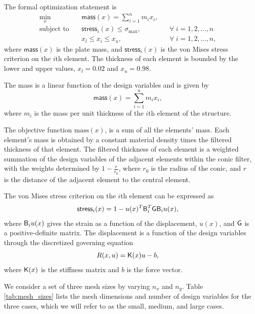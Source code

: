 The formal optimization statement is
\begin{equation*}
  \begin{alignedat}{2}
    \underset{x}{\text{min}} \quad &\textsf{mass}(x) = \sum_{i=1}^{n} m_i x_i, & &\\
    \text{subject to} \quad &\textsf{stress}_i(x) \leq \sigma_{\max}, &
    &\forall\; i = 1,2,\ldots,n \\
      & x_l \leq x_i \leq  x_u, \qquad & &\forall\; i = 1,2,\ldots,n,
  \end{alignedat}
\end{equation*}
where $\textsf{mass}(x)$ is the plate mass, and $\textsf{stress}_{i}(x)$ is the
von Mises stress criterion on the $i$th element. The thickness of each element
is bounded by the lower and upper values, $x_l = 0.02$ and $x_u = 0.98$. 

The mass is a linear function
of the design variables and is given by
\begin{equation*}
  \textsf{mass}(x) = \sum_{i=1}^{n} m_i x_i,
\end{equation*}
where $m_i$ is the mass per unit thickness of the $i$th element of the
structure.

The objective function $\text{mass}(x)$, is a sum of all the elements' mass. 
Each element's mass is obtained by a constant material density times the filtered thickness of that element. 
The filtered thickness of each element is a weighted summation of the design variables 
of the adjacent elements within the conic filter, with the weights determined by 
$1-\frac{r}{r_0}$,  where $r_0$ is the radius of the conic, and $r$ is the distance 
of the adjacent element to the central element.  


The von Mises stress
criterion on the $i$th element can be expressed as
\begin{equation*}
  \textsf{stress}_i(x) = 1 - u(x)^T \mathsf{B}_i^T \mathsf{G} \mathsf{B}_i u(x),
\end{equation*}
where $\mathsf{B}_i u(x)$ gives the strain as a function of the displacement,
$u(x)$, and $\mathsf{G}$ is a positive-definite matrix.  The displacement is a
function of the design variables through the discretized governing equation
\begin{equation*}
  R(x,u) = \mathsf{K}(x) u - b,
\end{equation*}
where $\mathsf{K}(x)$ is the stiffness matrix and $b$ is the force vector.

We consider a set of three mesh sizes by varying $n_x$ and $n_y$.  Table
\ref{tab:mesh_sizes} lists the mesh dimensions and number of design variables
for the three cases, which we will refer to as the small, medium, and large
cases.

